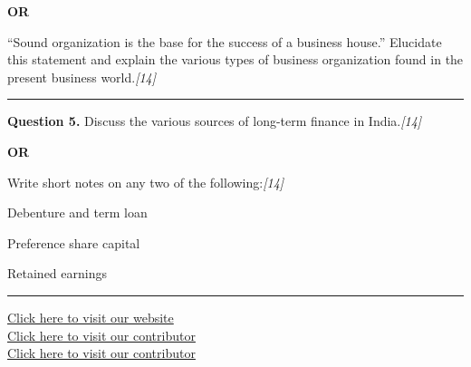 \documentclass[11pt,a4paper]{article}
\newcommand{\pts}[1]{\hfill   \textit{[#1]}}
\begin{document}
\centerline{   \textbf{OR}}

``Sound organization is the base for the success of a business house.'' Elucidate this statement and explain the various types of business organization found in the present business world.\pts{14}

\medskip\rule{\linewidth}{0.2pt}




\noindent   \textbf{Question 5.}
Discuss the various sources of long-term finance in India.\pts{14}

\centerline{   \textbf{OR}}

Write short notes on any two of the following:\pts{14}

\begin{parts}
  \item Debenture and term loan
  \item Preference share capital
  \item Retained earnings
\end{parts}

\vfill
\rule{\linewidth}{0.4pt}

\begin{center}\small
\href{https://bhu-exam.vercel.app/}{Click here to visit our website}\\[4pt]
\href{https://me-aryan.vercel.app/}{Click here to visit our contributor}\\[4pt]
\href{https://quashan-me.vercel.app/}{Click here to visit our contributor}
\end{center}
\end{document}

